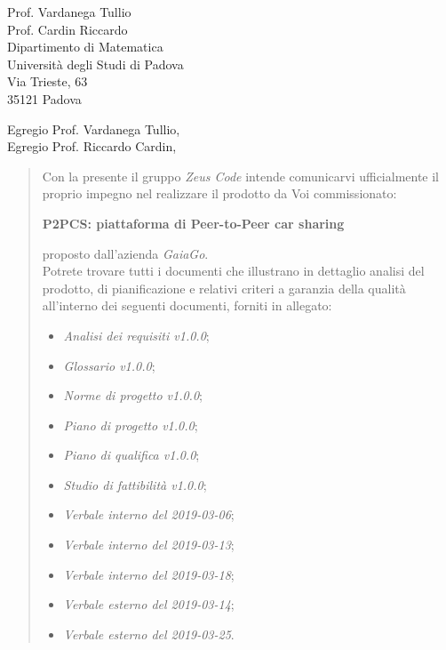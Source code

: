 \begin{letter}{
		Prof. Vardanega Tullio \\
		Prof. Cardin Riccardo \\
		Dipartimento di Matematica \\
		Università degli Studi di Padova \\
		Via Trieste, 63 \\
		35121 Padova}
		
\opening{Egregio Prof. Vardanega Tullio,\\Egregio Prof. Riccardo Cardin,}

\begin{quotation}
Con la presente il gruppo \textit{Zeus Code} intende comunicarvi ufficialmente il proprio impegno nel realizzare il prodotto da Voi 
commissionato:

\begin{center}
	\textbf{P2PCS: piattaforma di Peer-to-Peer car sharing}
\end{center}

\noindent proposto dall'azienda \textit{GaiaGo}.\\
Potrete trovare tutti i documenti che illustrano in dettaglio analisi del prodotto, di pianificazione e relativi criteri a garanzia della qualità all'interno dei seguenti 
documenti, forniti in allegato:

\begin{itemize}
	\item \textit{Analisi dei requisiti v1.0.0};
	
	\item \textit{Glossario v1.0.0};
	
	\item \textit{Norme di progetto v1.0.0};

	\item \textit{Piano di progetto v1.0.0};

	\item \textit{Piano di qualifica v1.0.0};

	\item \textit{Studio di fattibilità v1.0.0};

	\item \textit{Verbale interno del 2019-03-06};
	\item \textit{Verbale interno del 2019-03-13};
	\item \textit{Verbale interno del 2019-03-18};
	
	\item \textit{Verbale esterno del 2019-03-14};
	\item \textit{Verbale esterno del 2019-03-25}.
\end{itemize}


\end{quotation}
\end{letter}
